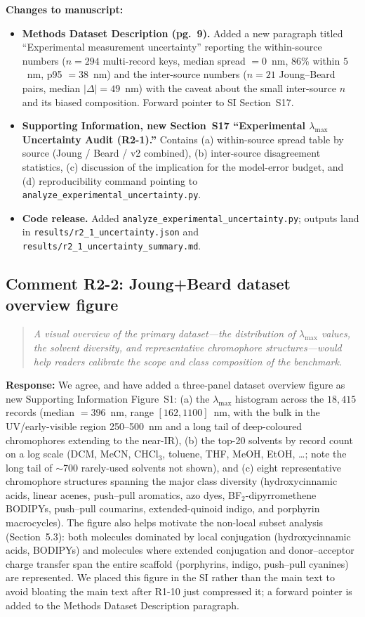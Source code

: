 \documentclass[11pt]{article}
\newenvironment{reviewer}{%
  \begin{quote}\itshape\color{black!70}}{%
  \end{quote}}
\newcommand{\response}[1]{\noindent\textbf{Response:} #1\par\medskip}
\newenvironment{changes}{%
  \noindent\textbf{Changes to manuscript:}
  \begin{itemize}[leftmargin=2em,itemsep=2pt]}{%
  \end{itemize}\medskip}
\begin{document}
\begin{changes}
  \item \textbf{Methods Dataset Description (pg.\ 9).} Added a new paragraph titled ``Experimental measurement uncertainty'' reporting the within-source numbers ($n = 294$ multi-record keys, median spread $= 0$~nm, $86$\% within $5$~nm, p95 $= 38$~nm) and the inter-source numbers ($n = 21$ Joung--Beard pairs, median $|\Delta| = 49$~nm) with the caveat about the small inter-source $n$ and its biased composition. Forward pointer to SI Section~S17.
  \item \textbf{Supporting Information, new Section~S17 ``Experimental $\lambda_{\max}$ Uncertainty Audit (R2-1).''} Contains (a) within-source spread table by source (Joung / Beard / v2 combined), (b) inter-source disagreement statistics, (c) discussion of the implication for the model-error budget, and (d) reproducibility command pointing to \texttt{analyze\_experimental\_uncertainty.py}.
  \item \textbf{Code release.} Added \texttt{analyze\_experimental\_uncertainty.py}; outputs land in \texttt{results/r2\_1\_uncertainty.json} and \texttt{results/r2\_1\_uncertainty\_summary.md}.
\end{changes}

\subsection*{Comment R2-2: Joung+Beard dataset overview figure}
\begin{reviewer}
A visual overview of the primary dataset---the distribution of $\lambda_{\max}$ values, the solvent diversity, and representative chromophore structures---would help readers calibrate the scope and class composition of the benchmark.
\end{reviewer}

\response{We agree, and have added a three-panel dataset overview figure as new Supporting Information Figure~S1: (a) the $\lambda_{\max}$ histogram across the $18{,}415$ records (median $= 396$~nm, range $[162, 1100]$~nm, with the bulk in the UV/early-visible region 250--500~nm and a long tail of deep-coloured chromophores extending to the near-IR), (b) the top-20 solvents by record count on a log scale (DCM, MeCN, CHCl$_3$, toluene, THF, MeOH, EtOH, \ldots; note the long tail of $\sim$700 rarely-used solvents not shown), and (c) eight representative chromophore structures spanning the major class diversity (hydroxycinnamic acids, linear acenes, push--pull aromatics, azo dyes, BF$_2$-dipyrromethene BODIPYs, push--pull coumarins, extended-quinoid indigo, and porphyrin macrocycles). The figure also helps motivate the non-local subset analysis (Section~5.3): both molecules dominated by local conjugation (hydroxycinnamic acids, BODIPYs) and molecules where extended conjugation and donor--acceptor charge transfer span the entire scaffold (porphyrins, indigo, push--pull cyanines) are represented. We placed this figure in the SI rather than the main text to avoid bloating the main text after R1-10 just compressed it; a forward pointer is added to the Methods Dataset Description paragraph.}
\end{document}
